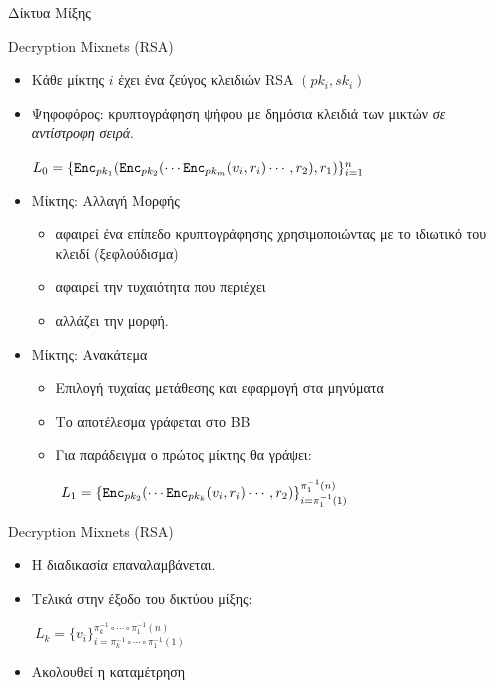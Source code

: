 \documentclass[handout]{beamer}
\begin{document}
\begin{section}{Δίκτυα Μίξης}
\begin{frame}{Decryption Mixnets (RSA)}
\begin{itemize}
    \item Κάθε μίκτης $i$ έχει ένα ζεύγος κλειδιών RSA $(pk_i, sk_i)$ \pause 
    \item Ψηφοφόρος: κρυπτογράφηση ψήφου με δημόσια κλειδιά των μικτών \textit{σε αντίστροφη σειρά}. 
        \begin{center}
        $L_0 = \{ \mathtt{Enc}_{pk_1}(\mathtt{Enc}_{pk_2}( \cdots \mathtt{Enc}_{pk_m}(v_i,r_i) \cdots, r_2), r_1) \}_{i=1}^n$
        \end{center}
    \item Μίκτης: Αλλαγή Μορφής \pause 
    \begin{itemize}
    \item αφαιρεί ένα επίπεδο κρυπτογράφησης χρησιμοποιώντας με το ιδιωτικό του κλειδί (ξεφλούδισμα)
    \item αφαιρεί την τυχαιότητα που περιέχει
    \item αλλάζει την μορφή.
    \end{itemize} \pause 
    \item Μίκτης: Ανακάτεμα \\ 
    \begin{itemize}
        \item Επιλογή τυχαίας μετάθεσης και εφαρμογή στα μηνύματα
        \item Το αποτέλεσμα γράφεται στο ΒΒ
        \item Για παράδειγμα ο πρώτος μίκτης θα γράψει:        
        \begin{center}
         $\ L_1 = \{ \mathtt{Enc}_{pk_2}( \cdots \mathtt{Enc}_{pk_k}(v_{i},r_{i}) \cdots, r_2) \}_{i=\pi_1^{-1}(1)}^{\pi_1^{-1}(n)} $
        \end{center}        
    \end{itemize} 
 \end{itemize}
 \end{frame}
 \begin{frame}{Decryption Mixnets (RSA)}
 \begin{itemize}
    \item Η διαδικασία επαναλαμβάνεται. \pause 
    \item Τελικά στην έξοδο  του δικτύου μίξης:
        \begin{center}
        $\ L_k = \{  v_{i} \}_{i=\pi_k^{-1} \circ \cdots \circ \pi_1^{-1}(1)}^{\pi_k^{-1} \circ \cdots \circ \pi_1^{-1}(n)} $
        \end{center} \pause 
    \item Ακολουθεί η καταμέτρηση 

\end{itemize}
\end{frame}
\end{section}
\end{document}
